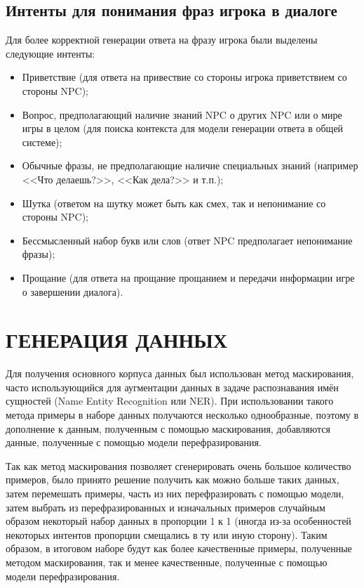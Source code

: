 \subsection{Интенты для понимания фраз игрока в диалоге}
Для более корректной генерации ответа на фразу игрока были выделены следующие интенты:
\begin{itemize}
   \item Приветствие (для ответа на привествие со стороны игрока приветствием со стороны NPC);
   \item Вопрос, предполагающий наличие знаний NPC о других NPC или о мире игры в целом (для поиска контекста для модели генерации ответа в общей системе);
   \item Обычные фразы, не предполагающие наличие специальных знаний (например <<Что делаешь?>>, <<Как дела?>> и т.п.);
   \item Шутка (ответом на шутку может быть как смех, так и непонимание со стороны NPC);
   \item Бессмысленный набор букв или слов (ответ NPC предполагает непонимание фразы);
   \item Прощание (для ответа на прощание прощанием и передачи информации игре о завершении диалога).
\end{itemize}

\section{ГЕНЕРАЦИЯ ДАННЫХ}
Для получения основного корпуса данных был использован метод маскирования, часто использующийся для аугментации данных в задаче распознавания имён сущностей (Name Entity Recognition или NER). При использовании такого метода примеры в наборе данных получаются несколько однообразные, поэтому в дополнение к данным, полученным с помощью маскирования, добавляются данные, полученные с помощью модели перефразирования.

Так как метод маскирования позволяет сгенерировать очень большое количество примеров, было принято решение получить как можно больше таких данных, затем перемешать примеры, часть из них перефразировать с помощью модели, затем выбрать из перефразированных и изначальных примеров случайным образом некоторый набор данных в пропорции 1 к 1 (иногда из-за особенностей некоторых интентов пропорции смещались в ту или иную сторону). Таким образом, в итоговом наборе будут как более качественные примеры, полученные методом маскирования, так и менее качественные, полученные с помощью модели перефразирования.

